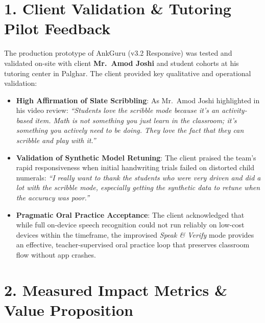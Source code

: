 \documentclass[10pt,a4paper]{article}
\begin{document}
\section*{1. Client Validation \& Tutoring Pilot Feedback}
The production prototype of AnkGuru (v3.2 Responsive) was tested and validated on-site with client \textbf{Mr.~Amod Joshi} and student cohorts at his tutoring center in Palghar. The client provided key qualitative and operational validation:
\begin{itemize}[itemsep=2.5pt]
    \item \textbf{High Affirmation of Slate Scribbling}: As Mr.~Amod Joshi highlighted in his video review: \textit{``Students love the scribble mode because it's an activity-based item. Math is not something you just learn in the classroom; it's something you actively need to be doing. They love the fact that they can scribble and play with it.''}
    \item \textbf{Validation of Synthetic Model Retuning}: The client praised the team's rapid responsiveness when initial handwriting trials failed on distorted child numerals: \textit{``I really want to thank the students who were very driven and did a lot with the scribble mode, especially getting the synthetic data to retune when the accuracy was poor.''}
    \item \textbf{Pragmatic Oral Practice Acceptance}: The client acknowledged that while full on-device speech recognition could not run reliably on low-cost devices within the timeframe, the improvised \textit{Speak \& Verify} mode provides an effective, teacher-supervised oral practice loop that preserves classroom flow without app crashes.
\end{itemize}

\vspace{-2pt}
\section*{2. Measured Impact Metrics \& Value Proposition}
\end{document}
